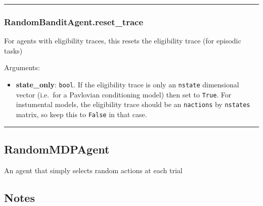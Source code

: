 \begin{center}\rule{0.5\linewidth}{\linethickness}\end{center}

\subsubsection{RandomBanditAgent.reset\_trace}\label{randombanditagent.reset_trace}

\begin{Shaded}
\begin{Highlighting}[]
\OperatorTok{=}\NormalTok{)}
\end{Highlighting}
\end{Shaded}

For agents with eligibility traces, this resets the eligibility trace
(for episodic tasks)

Arguments:

\begin{itemize}
\tightlist
\item
  \textbf{state\_only}: \texttt{bool}. If the eligibility trace is only
  an \texttt{nstate} dimensional vector (i.e.~for a Pavlovian
  conditioning model) then set to \texttt{True}. For instumental models,
  the eligibility trace should be an \texttt{nactions} by
  \texttt{nstates} matrix, so keep this to \texttt{False} in that case.
\end{itemize}

\begin{center}\rule{0.5\linewidth}{\linethickness}\end{center}

\subsection{RandomMDPAgent}\label{randommdpagent}

\begin{Shaded}
\begin{Highlighting}[]
\end{Highlighting}
\end{Shaded}

An agent that simply selects random actions at each trial

\subsection{Notes}\label{notes}

